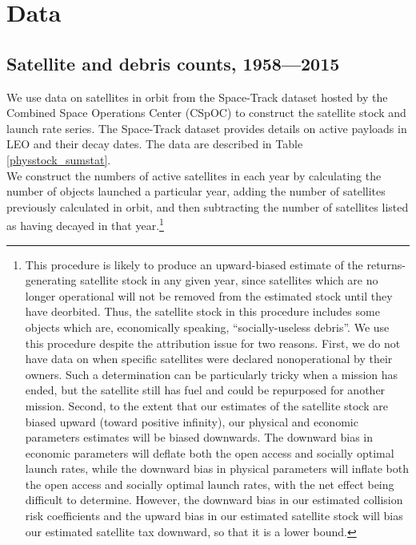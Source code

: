 \documentclass[12pt]{article}
\begin{document}
\section{Data}

\subsection{Satellite and debris counts, 1958---2015}

We use data on satellites in orbit from the Space-Track dataset hosted by the Combined Space Operations Center (CSpOC) \citep{spacetrackData} to construct the satellite stock and launch rate series. The Space-Track dataset provides details on active payloads in LEO and their decay dates. The data are described in Table \ref{physstock_sumstat}.\\

We construct the numbers of active satellites in each year by calculating the number of objects launched a particular year, adding the number of satellites previously calculated in orbit, and then subtracting the number of satellites listed as having decayed in that year.\footnote{This procedure is likely to produce an upward-biased estimate of the returns-generating satellite stock in any given year, since satellites which are no longer operational will not be removed from the estimated stock until they have deorbited. Thus, the satellite stock in this procedure includes some objects which are, economically speaking, ``socially-useless debris''. We use this procedure despite the attribution issue for two reasons. First, we do not have data on when specific satellites were declared nonoperational by their owners. Such a determination can be particularly tricky when a mission has ended, but the satellite still has fuel and could be repurposed for another mission. Second, to the extent that our estimates of the satellite stock are biased upward (toward positive infinity), our physical and economic parameters estimates will be biased downwards. The downward bias in economic parameters will deflate both the open access and socially optimal launch rates, while the downward bias in physical parameters will inflate both the open access and socially optimal launch rates, with the net effect being difficult to determine. However, the downward bias in our estimated collision risk coefficients and the upward bias in our estimated satellite stock will bias our estimated satellite tax downward, so that it is a lower bound.} \\
\end{document}

